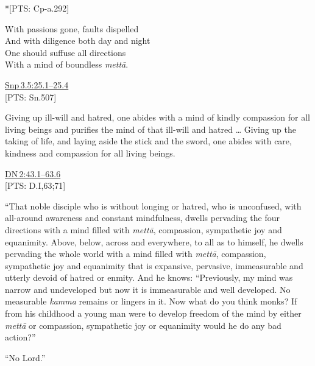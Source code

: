 \documentclass[10pt, openright]{book}
\begin{document}
\begin{flushright}
*[PTS: Cp-a.292]


\end{flushright}


\begin{itemize}


With passions gone, faults dispelled \\ 
And with diligence both day and night \\ 
One should suffuse all directions \\ 
With a mind of boundless \textit{mettā}.


\end{itemize}
\begin{flushright}
\href{https://suttacentral.net/snp3.5/en/sujato\#25.1}{Snp 3.5:25.1–25.4}\\

[PTS: Sn.507]


\end{flushright}
Giving up ill-will and hatred, one abides with a mind of kindly compassion for all living beings and purifies the mind of that ill-will and hatred … Giving up the taking of life, and laying aside the stick and the sword, one abides with care, kindness and compassion for all living beings.


\begin{flushright}
\href{https://suttacentral.net/dn2/en/sujato\#43.1}{DN 2:43.1–63.6}\\

[PTS: D.I,63;71]


\end{flushright}
“That noble disciple who is without longing or hatred, who is unconfused, with all-around awareness and constant mindfulness, dwells pervading the four directions with a mind filled with \textit{mettā}, compassion, sympathetic joy and equanimity. Above, below, across and everywhere, to all as to himself, he dwells pervading the whole world with a mind filled with \textit{mettā}, compassion, sympathetic joy and equanimity that is expansive, pervasive, immeasurable and utterly devoid of hatred or enmity. And he knows: “Previously, my mind was narrow and undeveloped but now it is immeasurable and well developed. No measurable \textit{kamma} remains or lingers in it. Now what do you think monks? If from his childhood a young man were to develop freedom of the mind by either \textit{mettā} or compassion, sympathetic joy or equanimity would he do any bad action?”


“No Lord.”
\end{document}
